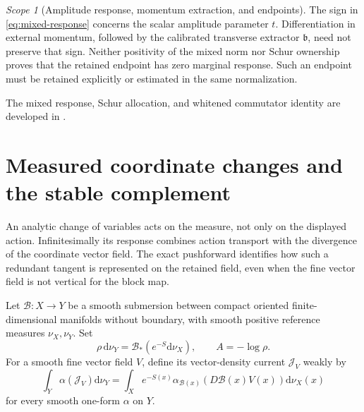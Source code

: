 \documentclass[11pt,oneside,openany]{book}
\theoremstyle{definition}
\theoremstyle{remark}
\newtheorem{scope}[scope]{Scope}
\newcommand{\dd}{\mathrm d}
\newcommand{\src}[2]{\cite[#2]{#1}}
\newcommand{\sourcebasis}[1]{\par\smallskip\noindent #1\par}
\begin{document}
\begin{scope}[Amplitude response, momentum extraction, and endpoints]
The sign in \cref{eq:mixed-response} concerns the scalar amplitude
parameter $t$. Differentiation in external momentum, followed by the
calibrated transverse extractor $\mathfrak b$, need not preserve that
sign. Neither positivity of the mixed norm nor Schur ownership proves
that the retained endpoint has zero marginal response. Such an endpoint
must be retained explicitly or estimated in the same normalization.
\end{scope}
\sourcebasis{The mixed response, Schur allocation, and whitened
commutator identity are developed in \src{SM}{V1--V4}.}


\section{Measured coordinate changes and the stable complement}
\label{sec:measured-redundancy}
An analytic change of variables acts on the measure, not only on the
displayed action. Infinitesimally its response combines action transport
with the divergence of the coordinate vector field. The exact
pushforward identifies how such a redundant tangent is represented on
the retained field, even when the fine vector field is not vertical for
the block map.

Let $\mathcal B:X\to Y$ be a smooth submersion between compact oriented
finite-dimensional manifolds without boundary, with smooth positive
reference measures $\nu_X,\nu_Y$. Set
\[
\rho\,\dd\nu_Y=\mathcal B_*(e^{-S}\dd\nu_X),
\qquad A=-\log\rho.
\]
For a smooth fine vector field $V$, define its vector-density current
$\mathcal J_V$ weakly by
\begin{equation}\label{eq:pushed-vector-current}
\int_Y\alpha(\mathcal J_V)\dd\nu_Y
=\int_Xe^{-S(x)}\alpha_{\mathcal B(x)}
       (D\mathcal B(x)V(x))\dd\nu_X(x)
\end{equation}
for every smooth one-form $\alpha$ on $Y$.
\end{document}
